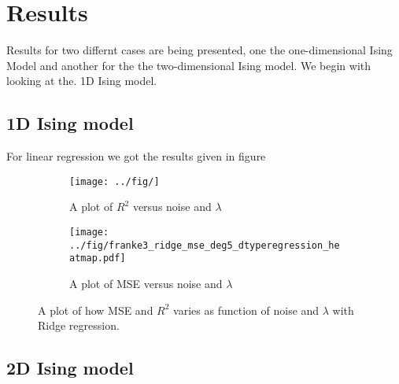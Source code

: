 \section{Results}
Results for two differnt cases are being presented, one the one-dimensional Ising Model and another for the the two-dimensional Ising model. We begin with looking at the. 1D Ising model.

\subsection{1D Ising model}
For linear regression we got the results given in figure 
\begin{figure}
    \centering
    \begin{subfigure}[b]{0.5\textwidth}
        \centering
        \texttt{[image: ../fig/]}
        \caption{A plot of $R^2$ versus noise and $\lambda$}
        \label{fig:franke_heatmat_r2_ridge}
    \end{subfigure}%
    \begin{subfigure}[b]{0.5\textwidth}
        \centering
        \texttt{[image: ../fig/franke3\_ridge\_mse\_deg5\_dtyperegression\_heatmap.pdf]}
        \caption{A plot of MSE versus noise and $\lambda$}
        \label{fig:franke_heatmat_mse_ridge}
    \end{subfigure}
    \caption{A plot of how MSE and $R^2$ varies as function of noise and $\lambda$ with Ridge regression.}
    \label{fig:mse_r2_heatmaps_ff_ridge}
\end{figure}


\subsection{2D Ising model}